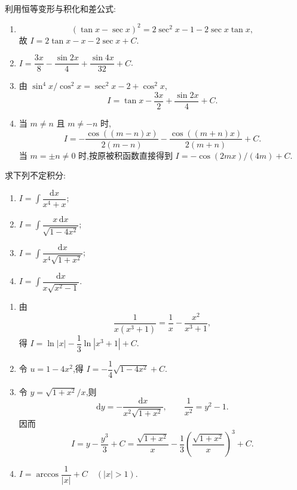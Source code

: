 \begin{solution}
    利用恒等变形与积化和差公式:
    \begin{enumerate}
        \item
              \[
                  (\tan x-\sec x)^2=2\sec^2x-1-2\sec x\tan x,
              \]
              故 $I=2\tan x-x-2\sec x+C$.
        \item $\displaystyle I=\dfrac{3x}{8}-\dfrac{\sin2x}{4}+\dfrac{\sin4x}{32}+C$.
        \item 由 $\sin^4x/\cos^2x=\sec^2x-2+\cos^2x$,
              \[
                  I=\tan x-\dfrac{3x}{2}+\dfrac{\sin2x}{4}+C.
              \]
        \item 当 $m\neq n$ 且 $m\neq-n$ 时,
              \[
                  I=-\dfrac{\cos((m-n)x)}{2(m-n)}
                  -\dfrac{\cos((m+n)x)}{2(m+n)}+C.
              \]
              当 $m=\pm n\neq0$ 时,按原被积函数直接得到
              $I=-\cos(2mx)/(4m)+C$.
    \end{enumerate}
\end{solution}

\begin{example}
    求下列不定积分:
    \begin{enumerate}
        \item $\displaystyle I=\int\dfrac{\mathrm{d}x}{x^4+x}$;
        \item $\displaystyle I=\int\dfrac{x\,\mathrm{d}x}{\sqrt{1-4x^2}}$;
        \item $\displaystyle I=\int\dfrac{\mathrm{d}x}{x^4\sqrt{1+x^2}}$;
        \item $\displaystyle I=\int\dfrac{\mathrm{d}x}{x\sqrt{x^2-1}}$.
    \end{enumerate}
\end{example}
\exampleblank

\begin{solution}
    \begin{enumerate}
        \item 由
              \[
                  \dfrac{1}{x(x^3+1)}=\dfrac{1}{x}-\dfrac{x^2}{x^3+1},
              \]
              得 $\displaystyle I=\ln|x|-\dfrac{1}{3}\ln|x^3+1|+C$.
        \item 令 $u=1-4x^2$,得 $\displaystyle I=-\dfrac{1}{4}\sqrt{1-4x^2}+C$.
        \item 令 $y=\sqrt{1+x^2}/x$,则
              \[
                  \mathrm{d}y=-\dfrac{\mathrm{d}x}{x^2\sqrt{1+x^2}},
                  \qquad
                  \dfrac{1}{x^2}=y^2-1.
              \]
              因而
              \[
                  I=y-\dfrac{y^3}{3}+C
                  =\dfrac{\sqrt{1+x^2}}{x}
                  -\dfrac{1}{3}\left(\dfrac{\sqrt{1+x^2}}{x}\right)^3+C.
              \]
        \item $\displaystyle I=\arccos\dfrac{1}{|x|}+C\quad(|x|>1)$.
    \end{enumerate}
\end{solution}

